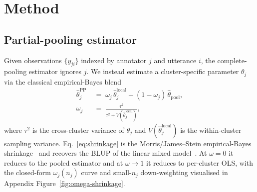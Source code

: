\documentclass{article}
\begin{document}
\section{Method}\label{sec:method}

\subsection{Partial-pooling estimator}\label{sec:pp}
Given observations $\{y_{ji}\}$ indexed by annotator $j$ and utterance
$i$, the complete-pooling estimator ignores $j$. We instead estimate a
cluster-specific parameter $\theta_j$ via the classical empirical-Bayes
blend
\begin{align}
  \hat\theta_j^{\mathrm{PP}}
  &\;=\;
  \omega_j\,\hat\theta_j^{\mathrm{local}}
  + (1-\omega_j)\,\hat\theta_{\mathrm{pool}}, \\
  \omega_j &\;=\; \frac{\tau^2}{\tau^2 + V(\hat\theta_j^{\mathrm{local}})},
  \label{eq:shrinkage}
\end{align}
where $\tau^2$ is the cross-cluster variance of $\theta_j$ and
$V(\hat\theta_j^{\mathrm{local}})$ is the within-cluster sampling
variance. Eq.~\eqref{eq:shrinkage} is the Morris/James--Stein
empirical-Bayes shrinkage~\citep{morris1983parametric} and recovers the
BLUP of the linear mixed model~\citep{henderson1975best}. At $\omega{=}0$
it reduces to the pooled estimator and at $\omega{\to}1$ it reduces
to per-cluster OLS, with the closed-form $\omega_j(n_j)$ curve and
small-$n_j$ down-weighting visualised in Appendix
Figure~\ref{fig:omega-shrinkage}.

\end{document}
